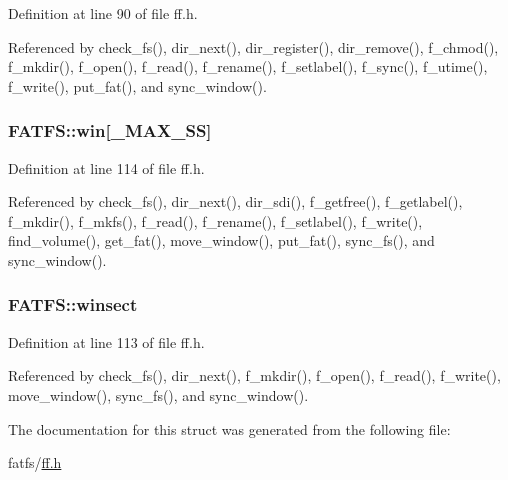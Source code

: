 Definition at line 90 of file ff.\+h.



Referenced by check\+\_\+fs(), dir\+\_\+next(), dir\+\_\+register(), dir\+\_\+remove(), f\+\_\+chmod(), f\+\_\+mkdir(), f\+\_\+open(), f\+\_\+read(), f\+\_\+rename(), f\+\_\+setlabel(), f\+\_\+sync(), f\+\_\+utime(), f\+\_\+write(), put\+\_\+fat(), and sync\+\_\+window().

\subsubsection[{\texorpdfstring{win}{win}}]{ F\+A\+T\+F\+S\+::win\mbox{[}{\bf \+\_\+\+M\+A\+X\+\_\+\+SS}\mbox{]}}\hypertarget{structFATFS_a7cc35a593465e727ab87723c14610644}{}\label{structFATFS_a7cc35a593465e727ab87723c14610644}


Definition at line 114 of file ff.\+h.



Referenced by check\+\_\+fs(), dir\+\_\+next(), dir\+\_\+sdi(), f\+\_\+getfree(), f\+\_\+getlabel(), f\+\_\+mkdir(), f\+\_\+mkfs(), f\+\_\+read(), f\+\_\+rename(), f\+\_\+setlabel(), f\+\_\+write(), find\+\_\+volume(), get\+\_\+fat(), move\+\_\+window(), put\+\_\+fat(), sync\+\_\+fs(), and sync\+\_\+window().

\subsubsection[{\texorpdfstring{winsect}{winsect}}]{ F\+A\+T\+F\+S\+::winsect}\hypertarget{structFATFS_ac60e69c00e6bf7c25febfbac4dc1476b}{}\label{structFATFS_ac60e69c00e6bf7c25febfbac4dc1476b}


Definition at line 113 of file ff.\+h.



Referenced by check\+\_\+fs(), dir\+\_\+next(), f\+\_\+mkdir(), f\+\_\+open(), f\+\_\+read(), f\+\_\+write(), move\+\_\+window(), sync\+\_\+fs(), and sync\+\_\+window().



The documentation for this struct was generated from the following file\+:\begin{DoxyCompactItemize}
\item 
fatfs/\hyperlink{ff_8h}{ff.\+h}\end{DoxyCompactItemize}

